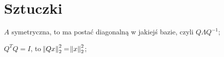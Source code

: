 \section{Sztuczki}

\entry
$A$ symetryczna, to ma postać diagonalną w jakiejś bazie, czyli $Q\Lambda Q^{-1}$;

\entry
$Q^TQ=I$, to $\norm{Qx}^2_2=\norm{x}^2_2$;
